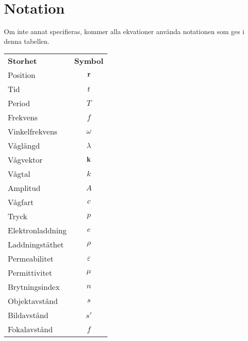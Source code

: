 \section{Notation}
Om inte annat specifieras, kommer alla ekvationer använda notationen som ges i denna tabellen.

\begin{table}[!h]
	\centering
	\begin{tabular}{| l | c |}
		\hline
		\textbf{Storhet} & \multicolumn{1}{|l|}{\textbf{Symbol}}\\
		Position         & $\vect{r}$ \\
		\hline
		Tid              & $t$ \\
		\hline
		Period           & $T$ \\
		\hline
		Frekvens         & $f$ \\
		\hline
		Vinkelfrekvens   & $\omega$ \\
		\hline
		Våglängd         & $\lambda$ \\
		\hline
		Vågvektor        & $\vect{k}$ \\
		\hline
		Vågtal           & $k$ \\
		\hline
		Amplitud         & $A$ \\
		\hline
		Vågfart          & $c$ \\
		\hline
		Tryck            & $p$ \\
		\hline
		Elektronladdning & $e$ \\
		\hline
		Laddningstäthet  & $\rho$ \\
		\hline
		Permeabilitet    & $\varepsilon$ \\
		\hline
		Permittivitet    & $\mu$ \\
		\hline
		Brytningsindex   & $n$ \\
		\hline
		Objektavstånd    & $s$ \\
		\hline
		Bildavstånd      & $s'$ \\
		\hline
		Fokalavstånd     & $f$ \\
		\hline
	\end{tabular}
\end{table}

